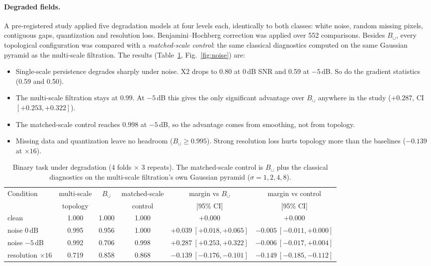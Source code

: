 \documentclass[11pt,a4paper]{article}
\begin{document}
\paragraph{Degraded fields.} A pre-registered study applied five degradation
models at four levels each, identically to both classes: white noise,
random missing pixels, contiguous gaps, quantization and resolution loss.
Benjamini--Hochberg correction was applied over 552 comparisons. Besides
$B_\cup$, every topological configuration was compared with a
\emph{matched-scale control}: the same classical diagnostics computed on the
same Gaussian pyramid as the multi-scale filtration. The results
(Table~\ref{tab:degraded}, Fig.~\ref{fig:noise}) are:
\begin{itemize}
\item Single-scale persistence degrades sharply under noise. X2 drops to 0.80
  at 0\,dB SNR and 0.59 at $-5$\,dB. So do the gradient statistics (0.59 and
  0.50).
\item The multi-scale filtration stays at 0.99. At $-5$\,dB this gives the
  only significant advantage over $B_\cup$ anywhere in the study ($+0.287$,
  CI $[+0.253,+0.322]$).
\item The matched-scale control reaches 0.998 at $-5$\,dB, so the advantage
  comes from smoothing, not from topology.
\item Missing data and quantization leave no headroom ($B_\cup\ge0.995$).
  Strong resolution loss hurts topology more than the baselines ($-0.139$ at
  $\times16$).
\end{itemize}

\begin{table}[t]
\centering
\small
\begin{tabular}{lccccc}
\toprule
Condition & multi-scale & $B_\cup$ & matched-scale & margin vs $B_\cup$ & margin vs control \\
 & topology & & control & [95\% CI] & [95\% CI] \\
\midrule
clean & 1.000 & 1.000 & 1.000 & $+0.000$ & $+0.000$ \\
noise 0\,dB & 0.995 & 0.956 & 1.000 & $+0.039\ [+0.018,+0.065]$ & $-0.005\ [-0.011,+0.000]$ \\
noise $-5$\,dB & 0.992 & 0.706 & 0.998 & $+0.287\ [+0.253,+0.322]$ & $-0.006\ [-0.017,+0.004]$ \\
resolution $\times16$ & 0.719 & 0.858 & 0.868 & $-0.139\ [-0.176,-0.101]$ & $-0.149\ [-0.185,-0.112]$ \\
\bottomrule
\end{tabular}
\caption{Binary task under degradation (4 folds $\times$ 3 repeats). The
matched-scale control is $B_\cup$ plus the classical diagnostics on the
multi-scale filtration's own Gaussian pyramid ($\sigma=1,2,4,8$).}
\label{tab:degraded}
\end{table}
\end{document}
